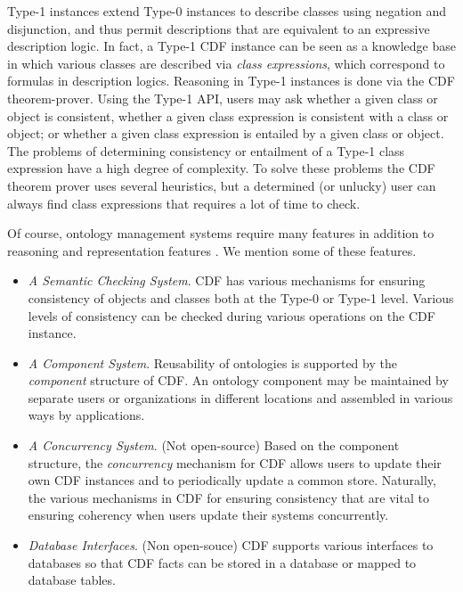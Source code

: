 Type-1 instances extend Type-0 instances to describe classes using
negation and disjunction, and thus permit descriptions that are
equivalent to an expressive description logic.  In fact, a Type-1 CDF
instance can be seen as a knowledge base in which various classes are
described via {\em class expressions}, which correspond to formulas in
description logics.  Reasoning in Type-1 instances is done via the CDF
theorem-prover.  Using the Type-1 API, users may ask whether a given
class or object is consistent, whether a given class expression is
consistent with a class or object; or whether a given class expression
is entailed by a given class or object.  The problems of determining
consistency or entailment of a Type-1 class expression have a high
degree of complexity.  To solve these problems the CDF theorem prover
uses several heuristics, but a determined (or unlucky) user can always
find class expressions that requires a lot of time to check.

Of course, ontology management systems require many features in
addition to reasoning and representation features \cite{MGPS03}.  We
mention some of these features.

\begin{itemize}
\item {\em A Semantic Checking System}.  CDF has various mechanisms for
ensuring consistency of objects and classes both at the Type-0 or
Type-1 level.  Various levels of consistency can be checked during
various operations on the CDF instance.
%
\item {\em A Component System}. Reusability of ontologies is supported
by the {\em component} structure of CDF.  An ontology component may be
maintained by separate users or organizations in different locations
and assembled in various ways by applications.
%
\item {\em A Concurrency System}. (Not open-source) Based on the
component structure, the {\em concurrency} mechanism for CDF allows
users to update their own CDF instances and to periodically update a
common store. Naturally, the various mechanisms in CDF for ensuring
consistency that are vital to ensuring coherency when users update
their systems concurrently.
%
\item {\em Database Interfaces}. (Non open-souce) CDF supports various
interfaces to databases so that CDF facts can be stored in a database
or mapped to database tables.
\end{itemize}

